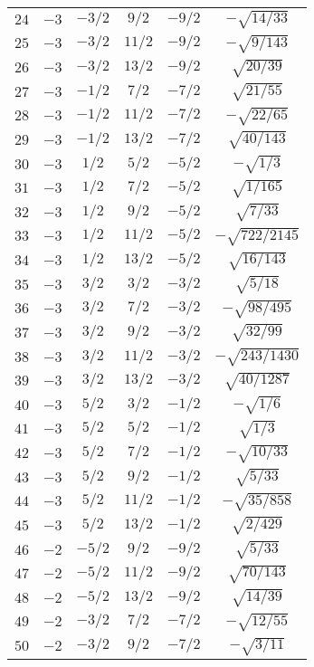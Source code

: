 \begin{table}
\begin{center}
\begin{tabular}{|c|c|c|c|c|c|}
$24$ & $-3$ & $-3/2$ & $9/2$ & $-9/2$ & $-\sqrt{14/33}$ \\ 
$25$ & $-3$ & $-3/2$ & $11/2$ & $-9/2$ & $-\sqrt{9/143}$ \\ 
$26$ & $-3$ & $-3/2$ & $13/2$ & $-9/2$ & $\sqrt{20/39}$ \\ 
$27$ & $-3$ & $-1/2$ & $7/2$ & $-7/2$ & $\sqrt{21/55}$ \\ 
$28$ & $-3$ & $-1/2$ & $11/2$ & $-7/2$ & $-\sqrt{22/65}$ \\ 
$29$ & $-3$ & $-1/2$ & $13/2$ & $-7/2$ & $\sqrt{40/143}$ \\ 
$30$ & $-3$ & $1/2$ & $5/2$ & $-5/2$ & $-\sqrt{1/3}$ \\ 
$31$ & $-3$ & $1/2$ & $7/2$ & $-5/2$ & $\sqrt{1/165}$ \\ 
$32$ & $-3$ & $1/2$ & $9/2$ & $-5/2$ & $\sqrt{7/33}$ \\ 
$33$ & $-3$ & $1/2$ & $11/2$ & $-5/2$ & $-\sqrt{722/2145}$ \\ 
$34$ & $-3$ & $1/2$ & $13/2$ & $-5/2$ & $\sqrt{16/143}$ \\ 
$35$ & $-3$ & $3/2$ & $3/2$ & $-3/2$ & $\sqrt{5/18}$ \\ 
$36$ & $-3$ & $3/2$ & $7/2$ & $-3/2$ & $-\sqrt{98/495}$ \\ 
$37$ & $-3$ & $3/2$ & $9/2$ & $-3/2$ & $\sqrt{32/99}$ \\ 
$38$ & $-3$ & $3/2$ & $11/2$ & $-3/2$ & $-\sqrt{243/1430}$ \\ 
$39$ & $-3$ & $3/2$ & $13/2$ & $-3/2$ & $\sqrt{40/1287}$ \\ 
$40$ & $-3$ & $5/2$ & $3/2$ & $-1/2$ & $-\sqrt{1/6}$ \\ 
$41$ & $-3$ & $5/2$ & $5/2$ & $-1/2$ & $\sqrt{1/3}$ \\ 
$42$ & $-3$ & $5/2$ & $7/2$ & $-1/2$ & $-\sqrt{10/33}$ \\ 
$43$ & $-3$ & $5/2$ & $9/2$ & $-1/2$ & $\sqrt{5/33}$ \\ 
$44$ & $-3$ & $5/2$ & $11/2$ & $-1/2$ & $-\sqrt{35/858}$ \\ 
$45$ & $-3$ & $5/2$ & $13/2$ & $-1/2$ & $\sqrt{2/429}$ \\ 
$46$ & $-2$ & $-5/2$ & $9/2$ & $-9/2$ & $\sqrt{5/33}$ \\ 
$47$ & $-2$ & $-5/2$ & $11/2$ & $-9/2$ & $\sqrt{70/143}$ \\ 
$48$ & $-2$ & $-5/2$ & $13/2$ & $-9/2$ & $\sqrt{14/39}$ \\ 
$49$ & $-2$ & $-3/2$ & $7/2$ & $-7/2$ & $-\sqrt{12/55}$ \\ 
$50$ & $-2$ & $-3/2$ & $9/2$ & $-7/2$ & $-\sqrt{3/11}$ \\ 

\end{tabular}
\end{center}
\end{table}
